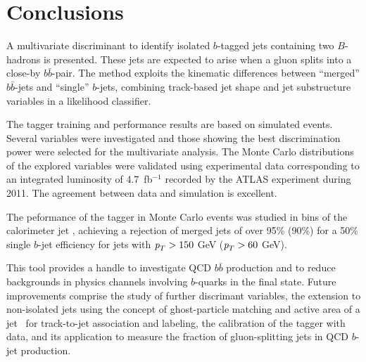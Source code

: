 %
%
\chapter{Conclusions}\label{ch:conclusions}

A multivariate discriminant to identify isolated $b$-tagged jets containing two $B$-hadrons is presented. These jets are expected to arise when a gluon splits into a close-by $b\bar{b}$-pair. The method exploits the kinematic differences between ``merged'' $b\bar{b}$-jets and ``single'' $b$-jets, combining track-based jet shape and jet substructure variables in a likelihood classifier.

The tagger training and performance results are based on simulated events. Several variables were investigated and those showing the best discrimination power were selected for the multivariate analysis. The Monte Carlo distributions of the explored variables were validated using experimental data corresponding to an integrated luminosity of 4.7~fb$^{-1}$ recorded by the ATLAS experiment during 2011. The agreement between data and simulation is excellent. 

 The peformance of the tagger in Monte Carlo events was studied in bins of the calorimeter jet \pt, achieving a rejection of merged jets of over 95\% (90\%) for a 50\% single $b$-jet efficiency for jets with ${\emph{p}_{T}}>150$ GeV (${\emph{p}_{T}}>60$ GeV).


This tool provides a handle to investigate QCD $b\bar{b}$ production and to reduce backgrounds in physics channels involving $b$-quarks in the final state.  Future improvements comprise the study of further discrimant variables, the extension to non-isolated jets using the concept of ghost-particle matching and active area of a jet~\cite{CatchmentArea} for track-to-jet association and labeling, the calibration of the tagger with data, and its application to measure the fraction of gluon-splitting jets in QCD $b$-jet production.







